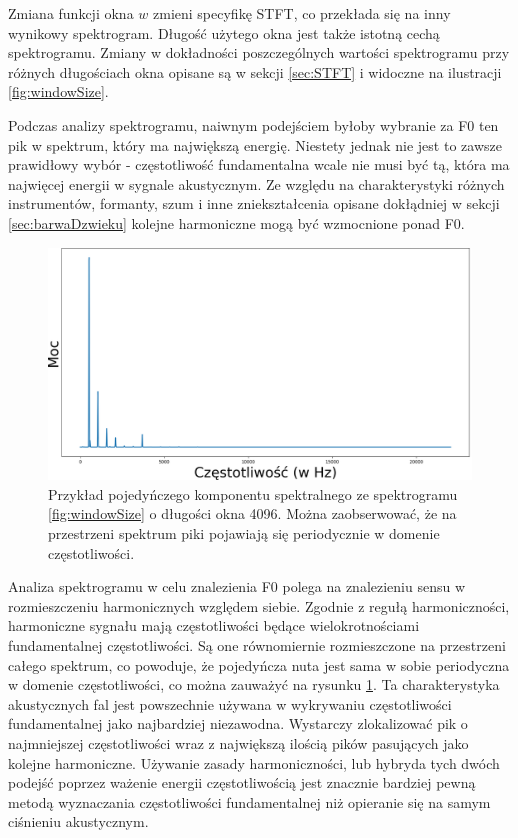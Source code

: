 \documentclass[12pt,a4paper,twoside]{mwart}
\begin{document}
Zmiana funkcji okna $w$ zmieni specyfikę STFT, co przekłada się na inny wynikowy spektrogram. Długość użytego okna jest także istotną cechą spektrogramu. Zmiany w dokładności poszczególnych wartości spektrogramu przy różnych długościach okna opisane są w sekcji \ref{sec:STFT} i widoczne na ilustracji \ref{fig:windowSize}.

Podczas analizy spektrogramu, naiwnym podejściem byłoby wybranie za F0 ten pik w spektrum, który ma największą energię. Niestety jednak nie jest to zawsze prawidłowy wybór - częstotliwość fundamentalna wcale nie musi być tą, która ma najwięcej energii w sygnale akustycznym. Ze względu na charakterystyki różnych instrumentów, formanty, szum i inne zniekształcenia opisane dokłądniej w sekcji \ref{sec:barwaDzwieku} kolejne harmoniczne mogą być wzmocnione ponad F0.

\begin{figure}[t]
  \begin{center}
    \includegraphics[scale=0.46]{images/Spectrogram/spectrum_4096_cropped.png}
    \caption{Przykład pojedyńczego komponentu spektralnego ze spektrogramu \ref{fig:windowSize} o długości okna 4096. Można zaobserwować, że na przestrzeni spektrum piki pojawiają się periodycznie w domenie częstotliwości.}
    \label{fig:spectralComponent}
  \end{center}
\end{figure}

Analiza spektrogramu w celu znalezienia F0 polega na znalezieniu sensu w rozmieszczeniu harmonicznych względem siebie. Zgodnie z regułą harmoniczności, harmoniczne sygnału mają częstotliwości będące wielokrotnościami fundamentalnej częstotliwości. Są one równomiernie rozmieszczone na przestrzeni całego spektrum, co powoduje, że pojedyńcza nuta jest sama w sobie periodyczna w domenie częstotliwości, co można zauważyć na rysunku \ref{fig:spectralComponent}. Ta charakterystyka akustycznych fal jest powszechnie używana w wykrywaniu częstotliwości fundamentalnej jako najbardziej niezawodna. Wystarczy zlokalizować pik o najmniejszej częstotliwości wraz z największą ilością pików pasujących jako kolejne harmoniczne. Używanie zasady harmoniczności, lub hybryda tych dwóch podejść poprzez ważenie energii częstotliwością jest znacznie bardziej pewną metodą wyznaczania częstotliwości fundamentalnej niż opieranie się na samym ciśnieniu akustycznym.
\end{document}
